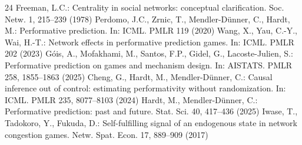 \documentclass{svproc}
\begin{document}
\begin{thebibliography}{24}
 Freeman, L.C.: Centrality in social networks:
conceptual clarification. Soc. Netw. 1, 215--239 (1978)
 Perdomo, J.C., Zrnic, T.,
Mendler-D\"unner, C., Hardt, M.: Performative prediction. In: ICML. PMLR 119 (2020)
 Wang, X., Yau, C.-Y., Wai, H.-T.: Network effects in performative prediction games. In: ICML. PMLR 202 (2023)
 G\'ois, A., Mofakhami, M., Santos, F.P.,
Gidel, G., Lacoste-Julien, S.: Performative prediction on games and
mechanism design. In: AISTATS. PMLR 258, 1855--1863 (2025)
 Cheng, G., Hardt, M., Mendler-D\"unner, C.: Causal inference out of control: estimating performativity without randomization. In: ICML. PMLR 235, 8077--8103 (2024)
 Hardt, M., Mendler-D\"unner, C.:
Performative prediction: past and future. Stat. Sci. 40, 417--436 (2025)
 Iwase, T., Tadokoro, Y., Fukuda, D.: Self-fulfilling
signal of an endogenous state in network congestion games. Netw. Spat. Econ. 17, 889--909 (2017)
\end{thebibliography}
\endgroup
\end{document}
